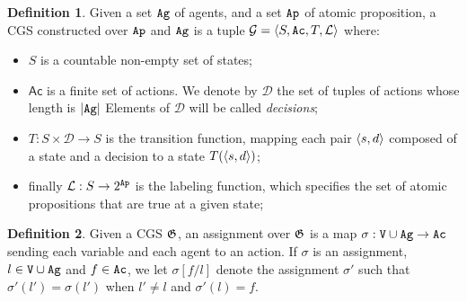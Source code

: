 \documentclass{article}
\theoremstyle{definition}
\newtheorem{definition}{Definition}[section]
\begin{document}
\begin{definition}
Given a set $\texttt{Ag}$ of agents, and a set $\texttt{Ap}$ of atomic proposition, a CGS constructed over $\texttt{Ap}$ and $\texttt{Ag}$ is a tuple 
$\mathcal{G}=\langle S, \texttt{Ac},T,\mathcal{L} \rangle$ where: 
\begin{itemize}
    \item $S$ is a countable non-empty set of states;
    \item $\mathsf{Ac}$ is a finite set of actions. We denote by $\mathcal{D}$ the set of tuples of actions whose length is $|\texttt{Ag}|$
    Elements of $\mathcal{D}$ will be called \emph{decisions}; 
    \item   $T: S \times \mathcal{D} \to S$ is the transition function, mapping each pair $\langle s,d \rangle$ composed of a state and a decision to a state $T(\langle s,d \rangle)$; 
    \item finally $\mathcal{L}: S\to 2^{\texttt{Ap}}$ is the labeling function, which specifies the set of atomic propositions that are true at a given state; 
 \end{itemize}
\end{definition}


\begin{definition}
    Given a CGS $\mathfrak{G}$, an assignment over $\mathfrak{G}$ is a map 
     $\sigma : \texttt{V} \cup \texttt{Ag} \to \texttt{Ac}$ sending each variable and each agent to  an action. If $\sigma$ is an assignment, $l\in \texttt{V} \cup \texttt{Ag}$ and $f\in \texttt{Ac}$, we let $\sigma[f/l]$ denote the assignment $\sigma'$ such that $\sigma'(l')=\sigma(l')$ when $l'\neq l$ and $\sigma'(l)=f$. 
 
\end{definition}
\end{document}
